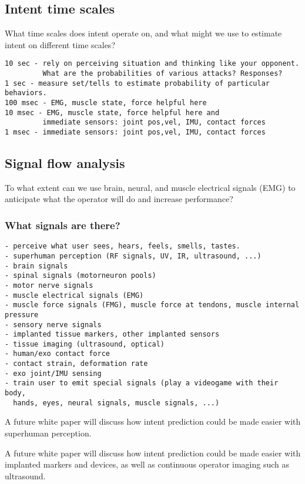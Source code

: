\documentclass[letterpaper,12pt,fullpage]{article}
\begin{document}
\subsection{Intent time scales}

What time scales does intent operate on, and what might we use
to estimate intent on different time scales?

\begin{verbatim}
10 sec - rely on perceiving situation and thinking like your opponent.
         What are the probabilities of various attacks? Responses?
1 sec - measure set/tells to estimate probability of particular behaviors.
100 msec - EMG, muscle state, force helpful here
10 msec - EMG, muscle state, force helpful here and
         immediate sensors: joint pos,vel, IMU, contact forces
1 msec - immediate sensors: joint pos,vel, IMU, contact forces
\end{verbatim}

\subsection{Signal flow analysis}

To what extent can we use brain, neural, and muscle electrical signals
(EMG) to anticipate what the operator will do and increase performance?

\subsubsection{What signals are there?}

\begin{verbatim}
- perceive what user sees, hears, feels, smells, tastes.
- superhuman perception (RF signals, UV, IR, ultrasound, ...)
- brain signals
- spinal signals (motorneuron pools)
- motor nerve signals
- muscle electrical signals (EMG)
- muscle force signals (FMG), muscle force at tendons, muscle internal pressure
- sensory nerve signals
- implanted tissue markers, other implanted sensors
- tissue imaging (ultrasound, optical)
- human/exo contact force
- contact strain, deformation rate
- exo joint/IMU sensing
- train user to emit special signals (play a videogame with their body,
  hands, eyes, neural signals, muscle signals, ...)
\end{verbatim}

A future white paper will discuss how intent prediction could be 
made easier with superhuman perception.

A future white paper will discuss how intent prediction could be 
made easier with implanted markers and devices, as well as continuous
operator imaging such as ultrasound.
\end{document}
